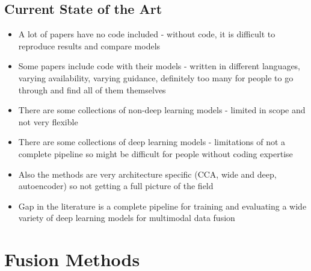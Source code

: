 \subsection{Current State of the Art}
\begin{itemize}
    \item A lot of papers have no code included - without code, it is difficult to reproduce results and compare models
    \item Some papers include code with their models - written in different languages, varying availability, varying guidance, definitely too many for people to go through and find all of them themselves
    \item There are some collections of non-deep learning models - limited in scope and not very flexible
    \item There are some collections of deep learning models - limitations of not a complete pipeline so might be difficult for people without coding expertise
    \item Also the methods are very architecture specific (CCA, wide and deep, autoencoder) so not getting a full picture of the field
    \item Gap in the literature is a complete pipeline for training and evaluating a wide variety of deep learning models for multimodal data fusion
\end{itemize}


\section{Fusion Methods}
